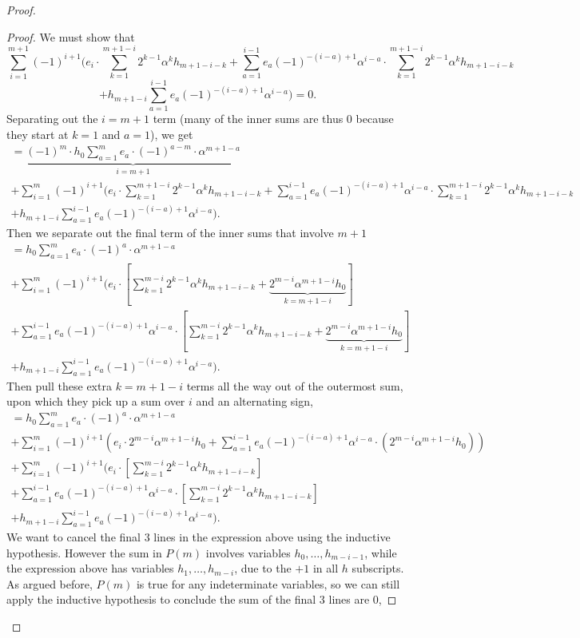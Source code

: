 \documentclass[10pt,a4paper]{amsart}
\begin{document}
\begin{proof}
\begin{proof}
We must show that 
$$
\sum_{i=1}^{m+1}(-1)^{i+1}\Bigg(e_i \cdot \sum_{k=1}^{m+1-i}2^{k-1}\alpha^kh_{m+1-i-k} + \sum_{a=1}^{i-1}e_a (-1)^{-(i-a)+1}\alpha^{i-a}\cdot \sum_{k=1}^{m+1-i}2^{k-1}\alpha^kh_{m+1-i-k}
$$
$$
+h_{m+1-i}\sum_{a=1}^{i-1}e_a(-1)^{-(i-a)+1}\alpha^{i-a}\Bigg)=0.
$$
Separating out the $i=m+1$ term (many of the inner sums are thus 0 because they start at $k=1$ and $a=1$), we get
\begin{gather*}
=\underbrace{(-1)^m\cdot h_0 \sum_{a=1}^me_a\cdot(-1)^{a-m}\cdot \alpha^{m+1-a}}_{i=m+1}\\
+\sum_{i=1}^{m}(-1)^{i+1}\Bigg(e_i \cdot \sum_{k=1}^{m+1-i}2^{k-1}\alpha^kh_{m+1-i-k} + \sum_{a=1}^{i-1}e_a (-1)^{-(i-a)+1}\alpha^{i-a}\cdot \sum_{k=1}^{m+1-i}2^{k-1}\alpha^kh_{m+1-i-k}\\
+h_{m+1-i}\sum_{a=1}^{i-1}e_a(-1)^{-(i-a)+1}\alpha^{i-a}\Bigg).
\end{gather*}
Then we separate out the final term of the inner sums that involve $m+1$
\begin{gather*}
= h_0 \sum_{a=1}^me_a\cdot(-1)^a\cdot \alpha^{m+1-a}\\
+\sum_{i=1}^{m}(-1)^{i+1}\Bigg(e_i \cdot \left[\sum_{k=1}^{m-i}2^{k-1}\alpha^kh_{m+1-i-k} +\underbrace{2^{m-i}\alpha^{m+1-i}h_0}_{k=m+1-i}\right]\\
+ \sum_{a=1}^{i-1}e_a (-1)^{-(i-a)+1}\alpha^{i-a}\cdot \left[\sum_{k=1}^{m-i}2^{k-1}\alpha^kh_{m+1-i-k}+\underbrace{2^{m-i}\alpha^{m+1-i}h_0}_{k=m+1-i}\right]\\
+h_{m+1-i}\sum_{a=1}^{i-1}e_a(-1)^{-(i-a)+1}\alpha^{i-a}\Bigg).
\end{gather*}
Then pull these extra $k=m+1-i$ terms all the way out of the outermost sum, upon which they pick up a sum over $i$ and an alternating sign,
\begin{gather*}
=h_0\sum_{a=1}^me_a\cdot(-1)^a\cdot \alpha^{m+1-a}\\
+\sum_{i=1}^m(-1)^{i+1}\left(e_i\cdot 2^{m-i}\alpha^{m+1-i}h_0 + \sum_{a=1}^{i-1}e_a(-1)^{-(i-a)+1}\alpha^{i-a}\cdot(2^{m-i}\alpha^{m+1-i}h_0)\right)\\
+\sum_{i=1}^{m}(-1)^{i+1}\Bigg(e_i \cdot \left[\sum_{k=1}^{m-i}2^{k-1}\alpha^kh_{m+1-i-k}\right]\\
+ \sum_{a=1}^{i-1}e_a (-1)^{-(i-a)+1}\alpha^{i-a}\cdot \left[\sum_{k=1}^{m-i}2^{k-1}\alpha^kh_{m+1-i-k}\right]\\
+h_{m+1-i}\sum_{a=1}^{i-1}e_a(-1)^{-(i-a)+1}\alpha^{i-a}\Bigg).
\end{gather*}
We want to cancel the final 3 lines in the expression above using the inductive hypothesis. However the sum in $P(m)$ involves variables $h_0,\dots,h_{m-i-1}$, while the expression above has variables $h_1,\dots,h_{m-i}$, due to the $+1$ in all $h$ subscripts. As argued before, $P(m)$ is true for any indeterminate variables, so we can still apply the inductive hypothesis to conclude the sum of the final 3 lines are 0,

\end{proof}
\end{proof}
\end{document}
